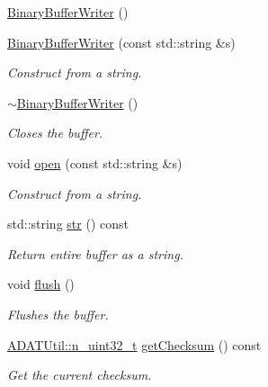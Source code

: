 \begin{DoxyCompactItemize}
\mbox{\hyperlink{classADATIO_1_1BinaryBufferWriter_a3812e6b5808e6349bae019f79d78094a}{Binary\+Buffer\+Writer}} ()
\item 
\mbox{\hyperlink{classADATIO_1_1BinaryBufferWriter_acdbd4afbd1fde21aff3ad80d3c67a43c}{Binary\+Buffer\+Writer}} (const std\+::string \&s)
\begin{DoxyCompactList}\small\item\em Construct from a string. \end{DoxyCompactList}\item 
\mbox{\hyperlink{classADATIO_1_1BinaryBufferWriter_a1d17b712ef50e475fe7e4acfe6642547}{$\sim$\+Binary\+Buffer\+Writer}} ()
\begin{DoxyCompactList}\small\item\em Closes the buffer. \end{DoxyCompactList}\item 
void \mbox{\hyperlink{classADATIO_1_1BinaryBufferWriter_a394d7bf949c4def18697af392fb217a5}{open}} (const std\+::string \&s)
\begin{DoxyCompactList}\small\item\em Construct from a string. \end{DoxyCompactList}\item 
std\+::string \mbox{\hyperlink{classADATIO_1_1BinaryBufferWriter_a5c4f9b9c049173452e1cc70fe27ee188}{str}} () const
\begin{DoxyCompactList}\small\item\em Return entire buffer as a string. \end{DoxyCompactList}\item 
void \mbox{\hyperlink{classADATIO_1_1BinaryBufferWriter_accc3319508a804b054d21b6bddeef85d}{flush}} ()
\begin{DoxyCompactList}\small\item\em Flushes the buffer. \end{DoxyCompactList}\item 
\mbox{\hyperlink{namespaceADATUtil_ad945a8afa4db2d1f89b731964adae97e}{A\+D\+A\+T\+Util\+::n\+\_\+uint32\+\_\+t}} \mbox{\hyperlink{classADATIO_1_1BinaryBufferWriter_a3d7ec1583f03981f0a84571646be46f3}{get\+Checksum}} () const
\begin{DoxyCompactList}\small\item\em Get the current checksum. \end{DoxyCompactList}\end{DoxyCompactItemize}
